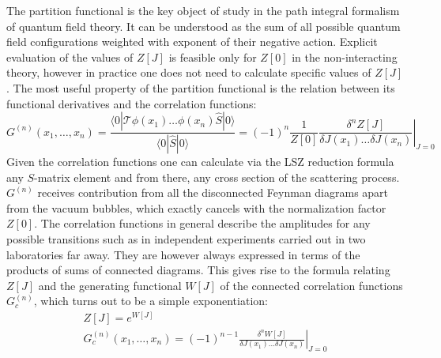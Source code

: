 \documentclass[11pt, a4paper]{article}
\begin{document}
The partition functional is the key object of study in the path integral formalism of quantum field theory.
It can be understood as the sum of all possible quantum field configurations weighted with exponent of their negative action.
Explicit evaluation of the values of $Z[J]$ is feasible only for $Z[0]$ in the non-interacting theory, however in practice one does not need to calculate specific values of $Z[J]$. The most useful property of the partition functional is the relation between its functional derivatives and the correlation functions:
\begin{equation}
G^{(n)}(x_1,\dots,x_n) =
\frac{\langle 0| \mathcal{T} \phi(x_1) \dots \phi(x_n) \hat{S} |0\rangle}{\langle 0 | \hat S |0\rangle} = 
(-1)^n \frac{1}{Z[0]}\left.\frac{\delta^n Z[J]}{\delta J(x_1) \dots \delta J(x_n)}\right|_{J=0}
\end{equation}
Given the correlation functions one can calculate via the LSZ reduction formula any $S$-matrix element and from there, any cross section of the scattering process.
$G^{(n)}$ receives contribution from all the disconnected Feynman diagrams apart from the vacuum bubbles, which exactly cancels with the normalization factor $Z[0]$.
The correlation functions in general describe the amplitudes for any possible transitions such as in independent experiments carried out in two laboratories far away. They are however always expressed in terms of the products of sums of connected diagrams. This gives rise to the formula relating $Z[J]$ and the generating functional $W[J]$ of the connected correlation functions $G_c^{(n)}$, which turns out to be a simple exponentiation:
\begin{gather}
    Z[J] = e^{W[J]}\\
    G_c^{(n)}(x_1,\dots,x_n) = (-1)^{n-1} \left.\frac{ \delta^n W[J]}{\delta J(x_1) \dots \delta J(x_n)}\right|_{J=0}
\end{gather}
\end{document}
